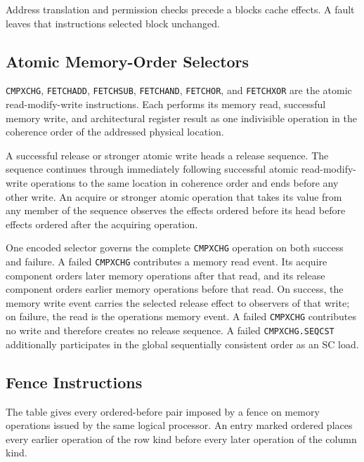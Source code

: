 Address translation and permission checks precede a block\textquotesingle{}s cache effects. A fault leaves that instruction\textquotesingle{}s
selected block unchanged.

\subsection{Atomic Memory-Order Selectors}


\texttt{CMPXCHG}, \texttt{FETCHADD}, \texttt{FETCHSUB}, \texttt{FETCHAND}, \texttt{FETCHOR}, and
\texttt{FETCHXOR} are the atomic read-modify-write instructions. Each performs its memory read, successful memory
write, and architectural register result as one indivisible operation in the coherence order of the addressed
physical location.

A successful release or stronger atomic write heads a release sequence. The sequence continues through immediately
following successful atomic read-modify-write operations to the same location in coherence order and ends before any
other write. An acquire or stronger atomic operation that takes its value from any member of the sequence observes
the effects ordered before its head before effects ordered after the acquiring operation.

One encoded selector governs the complete \texttt{CMPXCHG} operation on both success and failure. A failed
\texttt{CMPXCHG} contributes a memory read event. Its acquire component orders later memory operations after that read, and
its release component orders earlier memory operations before that read. On success, the memory write event carries the
selected release effect to observers of that write; on failure, the read is the operation\textquotesingle{}s memory event. A failed
\texttt{CMPXCHG} contributes no write and therefore creates no release sequence. A failed
\texttt{CMPXCHG.SEQCST} additionally participates in the global sequentially consistent order as an SC load.

\subsection{Fence Instructions}
The table gives every ordered-before pair imposed by a fence on memory operations issued by the same logical
processor. An entry marked ordered places every earlier operation of the row kind before every later operation of the
column kind.

